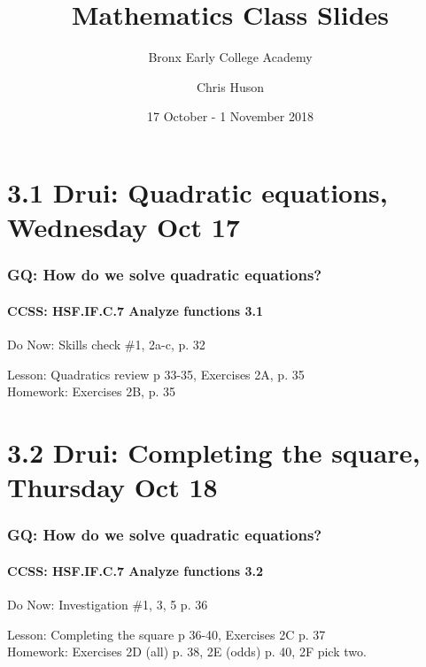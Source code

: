 \documentclass{beamer}
\title{Mathematics Class Slides}
\subtitle{Bronx Early College Academy}
\author{Chris Huson}
\date{17 October - 1 November 2018}
\begin{document}
\frame{\titlepage}

\section[Outline]{}
\frame{\tableofcontents}

\section{3.1 Drui: Quadratic equations, Wednesday Oct 17}
  \frame
  {
    \frametitle{GQ: How do we solve quadratic equations?}
    \framesubtitle{CCSS: HSF.IF.C.7 Analyze functions    \alert{3.1}}

    \begin{block}{Do Now: Skills check \#1, 2a-c, p. 32}
    \end{block}
    Lesson: Quadratics review p 33-35, Exercises 2A, p. 35 \\
    Homework: Exercises 2B, p. 35
  }

\section{3.2 Drui: Completing the square, Thursday Oct 18}
  \frame
  {
    \frametitle{GQ: How do we solve quadratic equations?}
    \framesubtitle{CCSS: HSF.IF.C.7 Analyze functions    \alert{3.2}}

    \begin{block}{Do Now: Investigation \#1, 3, 5 p. 36}
    \end{block}
    Lesson: Completing the square p 36-40, Exercises 2C p. 37 \\
    Homework: Exercises 2D (all) p. 38, 2E (odds) p. 40, 2F pick two.
  }
\end{document}
